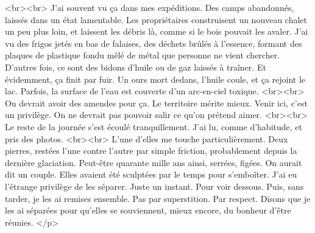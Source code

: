 <br><br>
J’ai souvent vu ça dans mes expéditions. Des camps abandonnés, laissés dans un état lamentable. Les propriétaires construisent un nouveau chalet un peu plus loin, et laissent les débris là, comme si le bois pouvait les avaler. J’ai vu des frigos jetés en bas de falaises, des déchets brûlés à l’essence, formant des plaques de plastique fondu mêlé de métal que personne ne vient chercher. D’autres fois, ce sont des bidons d’huile ou de gaz laissés à traîner. Et évidemment, ça finit par fuir. Un ours mort dedans, l’huile coule, et ça rejoint le lac. Parfois, la surface de l’eau est couverte d’un arc-en-ciel toxique.
<br><br>
On devrait avoir des amendes pour ça. Le territoire mérite mieux. Venir ici, c’est un privilège. On ne devrait pas pouvoir salir ce qu’on prétend aimer.
<br><br>
Le reste de la journée s’est écoulé tranquillement. J’ai lu, comme d’habitude, et pris des photos.
<br><br>
L’une d’elles me touche particulièrement. Deux pierres, restées l’une contre l’autre par simple friction, probablement depuis la dernière glaciation. Peut-être quarante mille ans ainsi, serrées, figées. On aurait dit un couple. Elles avaient été sculptées par le temps pour s’emboîter. J’ai eu l’étrange privilège de les séparer. Juste un instant. Pour voir dessous. Puis, sans tarder, je les ai remises ensemble. Pas par superstition. Par respect. Disons que je les ai séparées pour qu’elles se souviennent, mieux encore, du bonheur d’être réunies.
</p>








